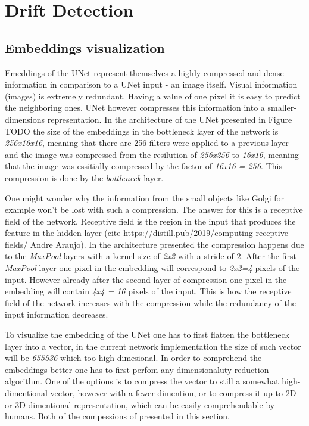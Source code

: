 \section{Drift Detection}
\subsection{Embeddings visualization}
Emeddings of the UNet represent themselves a highly compressed and dense information in comparison to a UNet input - an image itself. Visual information (images) is extremely redundant. Having a value of one pixel it is easy to predict the neighboring ones. UNet however compresses this information into a smaller-dimensions representation. In the architecture of the UNet presented in Figure TODO the size of the embeddings in the bottleneck layer of the network is \textit{256x16x16}, meaning that there are 256 filters were applied to a previous layer and the image was compressed from the resilution of \textit{256x256} to \textit{16x16}, meaning that the image was essitially compressed by the factor of \textit{16x16 = 256}. This compression is done by the \textit{bottleneck} layer.

One might wonder why the information from the small objects like Golgi for example won't be lost with such a compression. The answer for this is a receptive field of the network. Receptive field is the region in the input that produces the feature in the hidden layer (cite https://distill.pub/2019/computing-receptive-fields/ Andre Araujo). In the architecture presented the compression happens due to the \textit{MaxPool} layers with a kernel size of \textit{2x2} with a stride of $2$. After the first \textit{MaxPool} layer one pixel in the embedding will correspond to \textit{2x2=4} pixels of the input. However already after the second layer of compression one pixel in the embedding will contain \textit{4x4 = 16} pixels of the input. This is how the receptive field of the network increases with the compression while the redundancy of the input information decreases.

To visualize the embedding of the UNet one has to first flatten the bottleneck layer into a vector, in the current network implementation the size of such vector will be \textit{655536} which too high dimesional. In order to comprehend the embeddings better one has to first perfom any dimensionaluty reduction algorithm. One of the options is to compress the vector to still a somewhat high-dimentional vector, however with a fewer dimention, or to compress it up to 2D or 3D-dimentional representation, which can be easily comprehendable by humans. Both of the compessions of presented in this section.